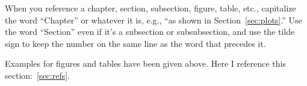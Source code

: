 When you reference a chapter, section, subsection, figure, table, etc., capitalize the word ``Chapter'' or whatever it is, e.g., ``as shown in Section~\ref{sec:plots}.''  Use the word ``Section'' even if it's a subsection or subsubsection, and use the tilde sign to keep the number on the same line as the word that precedes it.

Examples for figures and tables have been given above.  Here I
reference this section:~\ref{sec:refs}.  



